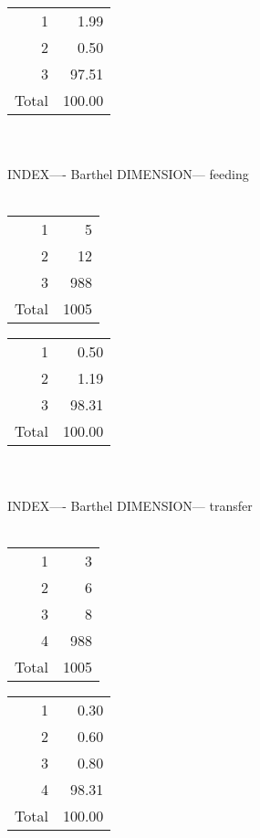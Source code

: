 \documentclass[11pt]{article}
\begin{document}
% 
\begin{tabular}{rr}
   \hline
1 & 1.99 \\ 
  2 & 0.50 \\ 
  3 & 97.51 \\ 
  Total & 100.00 \\ 
   \hline
\end{tabular}
\\\\ 
INDEX---- Barthel DIMENSION--- feeding 
 \\\\ 
% 
\begin{tabular}{rr}
   \hline
1 &   5 \\ 
  2 &  12 \\ 
  3 & 988 \\ 
  Total & 1005 \\ 
   \hline
\end{tabular}
% 
\begin{tabular}{rr}
   \hline
1 & 0.50 \\ 
  2 & 1.19 \\ 
  3 & 98.31 \\ 
  Total & 100.00 \\ 
   \hline
\end{tabular}
\\\\ 
INDEX---- Barthel DIMENSION--- transfer 
 \\\\ 
% 
\begin{tabular}{rr}
   \hline
1 &   3 \\ 
  2 &   6 \\ 
  3 &   8 \\ 
  4 & 988 \\ 
  Total & 1005 \\ 
   \hline
\end{tabular}
% 
\begin{tabular}{rr}
   \hline
1 & 0.30 \\ 
  2 & 0.60 \\ 
  3 & 0.80 \\ 
  4 & 98.31 \\ 
  Total & 100.00 \\ 
   \hline
\end{tabular}
\end{document}
